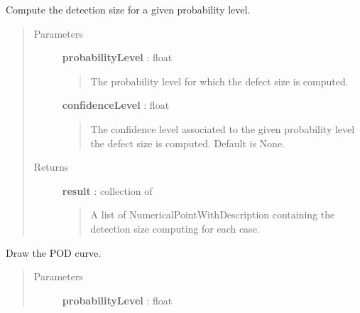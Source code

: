 \documentclass[letterpaper,10pt,english]{sphinxmanual}
\begin{document}
\begin{fulllineitems}

\begin{fulllineitems}
\label{_generated/otpod.UnivariateLinearModelPOD:otpod.UnivariateLinearModelPOD.computeDetectionSize}
Compute the detection size for a given probability level.
\begin{quote}\begin{description}
\item[{Parameters}] \leavevmode
\textbf{probabilityLevel} : float
\begin{quote}

The probability level for which the defect size is computed.
\end{quote}

\textbf{confidenceLevel} : float
\begin{quote}

The confidence level associated to the given probability level the
defect size is computed. Default is None.
\end{quote}

\item[{Returns}] \leavevmode
\textbf{result} : collection of \href{http://doc.openturns.org/openturns-latest/sphinx/user\_manual/\_generated/openturns.NumericalPointWithDescription.html\#openturns.NumericalPointWithDescription}{}
\begin{quote}

A list of NumericalPointWithDescription containing the detection size
computing for each case.
\end{quote}

\end{description}\end{quote}

\end{fulllineitems}


\begin{fulllineitems}
\label{_generated/otpod.UnivariateLinearModelPOD:otpod.UnivariateLinearModelPOD.drawPOD}
Draw the POD curve.
\begin{quote}\begin{description}
\item[{Parameters}] \leavevmode
\textbf{probabilityLevel} : float
\begin{quote}


\end{quote}
\end{description}
\end{quote}
\end{fulllineitems}
\end{fulllineitems}
\end{document}
